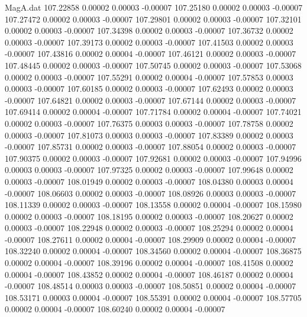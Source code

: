 \begin{filecontents}{MagA.dat}
 107.22858    0.00002    0.00003   -0.00007
 107.25180    0.00002    0.00003   -0.00007
 107.27472    0.00002    0.00003   -0.00007
 107.29801    0.00002    0.00003   -0.00007
 107.32101    0.00002    0.00003   -0.00007
 107.34398    0.00002    0.00003   -0.00007
 107.36732    0.00002    0.00003   -0.00007
 107.39173    0.00002    0.00003   -0.00007
 107.41503    0.00002    0.00003   -0.00007
 107.43816    0.00002    0.00004   -0.00007
 107.46121    0.00002    0.00003   -0.00007
 107.48445    0.00002    0.00003   -0.00007
 107.50745    0.00002    0.00003   -0.00007
 107.53068    0.00002    0.00003   -0.00007
 107.55291    0.00002    0.00004   -0.00007
 107.57853    0.00003    0.00003   -0.00007
 107.60185    0.00002    0.00003   -0.00007
 107.62493    0.00002    0.00003   -0.00007
 107.64821    0.00002    0.00003   -0.00007
 107.67144    0.00002    0.00003   -0.00007
 107.69414    0.00002    0.00004   -0.00007
 107.71784    0.00002    0.00004   -0.00007
 107.74021    0.00002    0.00003   -0.00007
 107.76375    0.00003    0.00003   -0.00007
 107.78758    0.00002    0.00003   -0.00007
 107.81073    0.00003    0.00003   -0.00007
 107.83389    0.00002    0.00003   -0.00007
 107.85731    0.00002    0.00003   -0.00007
 107.88054    0.00002    0.00003   -0.00007
 107.90375    0.00002    0.00003   -0.00007
 107.92681    0.00002    0.00003   -0.00007
 107.94996    0.00003    0.00003   -0.00007
 107.97325    0.00002    0.00003   -0.00007
 107.99648    0.00002    0.00003   -0.00007
 108.01949    0.00002    0.00003   -0.00007
 108.04380    0.00003    0.00004   -0.00007
 108.06603    0.00002    0.00003   -0.00007
 108.08926    0.00003    0.00003   -0.00007
 108.11339    0.00002    0.00003   -0.00007
 108.13558    0.00002    0.00004   -0.00007
 108.15980    0.00002    0.00003   -0.00007
 108.18195    0.00002    0.00003   -0.00007
 108.20627    0.00002    0.00003   -0.00007
 108.22948    0.00002    0.00003   -0.00007
 108.25294    0.00002    0.00004   -0.00007
 108.27611    0.00002    0.00004   -0.00007
 108.29909    0.00002    0.00004   -0.00007
 108.32240    0.00002    0.00004   -0.00007
 108.34560    0.00002    0.00004   -0.00007
 108.36875    0.00002    0.00004   -0.00007
 108.39196    0.00002    0.00004   -0.00007
 108.41508    0.00002    0.00004   -0.00007
 108.43852    0.00002    0.00004   -0.00007
 108.46187    0.00002    0.00004   -0.00007
 108.48514    0.00003    0.00003   -0.00007
 108.50851    0.00002    0.00004   -0.00007
 108.53171    0.00003    0.00004   -0.00007
 108.55391    0.00002    0.00004   -0.00007
 108.57705    0.00002    0.00004   -0.00007
 108.60240    0.00002    0.00004   -0.00007

\end{filecontents}
